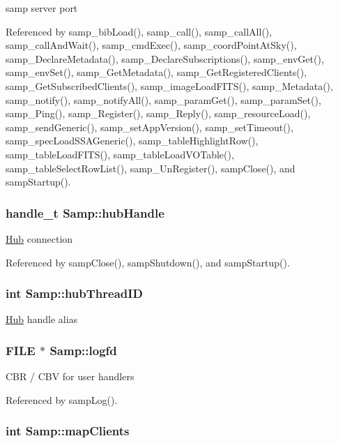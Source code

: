 samp server port 

Referenced by samp\_\-bibLoad(), samp\_\-call(), samp\_\-callAll(), samp\_\-callAndWait(), samp\_\-cmdExec(), samp\_\-coordPointAtSky(), samp\_\-DeclareMetadata(), samp\_\-DeclareSubscriptions(), samp\_\-envGet(), samp\_\-envSet(), samp\_\-GetMetadata(), samp\_\-GetRegisteredClients(), samp\_\-GetSubscribedClients(), samp\_\-imageLoadFITS(), samp\_\-Metadata(), samp\_\-notify(), samp\_\-notifyAll(), samp\_\-paramGet(), samp\_\-paramSet(), samp\_\-Ping(), samp\_\-Register(), samp\_\-Reply(), samp\_\-resourceLoad(), samp\_\-sendGeneric(), samp\_\-setAppVersion(), samp\_\-setTimeout(), samp\_\-specLoadSSAGeneric(), samp\_\-tableHighlightRow(), samp\_\-tableLoadFITS(), samp\_\-tableLoadVOTable(), samp\_\-tableSelectRowList(), samp\_\-UnRegister(), sampClose(), and sampStartup().\hypertarget{structSamp_03918136809ece7e60de4e30c64b6224}{
\subsubsection[{hubHandle}]{\setlength{\rightskip}{0pt plus 5cm}handle\_\-t {\bf Samp::hubHandle}}}
\label{structSamp_03918136809ece7e60de4e30c64b6224}


\hyperlink{structHub}{Hub} connection 

Referenced by sampClose(), sampShutdown(), and sampStartup().\hypertarget{structSamp_723b2538cfd65122c49783b36a7d30b5}{
\subsubsection[{hubThreadID}]{\setlength{\rightskip}{0pt plus 5cm}int {\bf Samp::hubThreadID}}}
\label{structSamp_723b2538cfd65122c49783b36a7d30b5}


\hyperlink{structHub}{Hub} handle alias \hypertarget{structSamp_79f2ee1f48cb40edaf9b63ccdbb6942f}{
\subsubsection[{logfd}]{\setlength{\rightskip}{0pt plus 5cm}FILE $\ast$ {\bf Samp::logfd}}}
\label{structSamp_79f2ee1f48cb40edaf9b63ccdbb6942f}


CBR / CBV for user handlers 

Referenced by sampLog().\hypertarget{structSamp_c8eee2b56f226f59d814fd1baa751b77}{
\subsubsection[{mapClients}]{\setlength{\rightskip}{0pt plus 5cm}int {\bf Samp::mapClients}}}
\label{structSamp_c8eee2b56f226f59d814fd1baa751b77}


